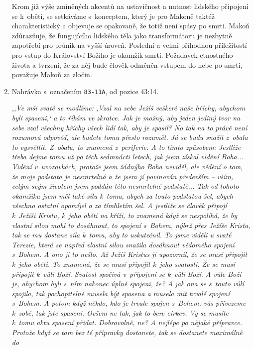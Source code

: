 \begin{enumerate}
{Krom již výše zmíněných akcentů na ustavičnost a nutnost lidského připojení se
        k~oběti, se setkáváme s~konceptem, který je pro Makoně taktéž
        charakteristický a objevuje se opakovaně, že totiž není spásy po smrti.
        Makoň zdůrazňuje, že fungujícího lidského těla jako transformátoru je
        nezbytně zapotřebí pro průnik na vyšší úroveň. Poslední a velmi
        příhodnou příležitostí pro vstup do Království Božího je okamžik smrti.
        Požadavek ctnostného života a tvrzení, že za něj bude člověk odměněn
        vstupem do nebe po smrti, považuje Makoň za zločin.

}

\item{
Nahrávka s~označením \texttt{83-11A}, od pozice 43:14.

\textit{%
,,Ve mši svaté se modlíme: ,Vzal na sebe Ježíš veškeré naše hříchy, abychom byli
spaseni,` a to říkám ve zkratce. Jak je možný, aby jeden jediný tvor na sebe
vzal všechny hříchy všech lidí tak, aby je spasil? No tak na to právě není
rozumová odpověď, ale budete tomu přesto rozumět. Já se budu snažit z~obalu to
vysvětlit. Z~obalu, to znamená z~periferie. A to tímto způsobem: Jestliže třeba
dejme tomu už po těch sedmnácti letech, jak jsem získal vidění Boha... Vidění
v~uvozovkách, protože jsem žádnýho Boha neviděl, ale vědění o tom, že moje
podstata je nesmrtelná a že jsem jí povinován především -- vším, celým svým
životem jsem poddán této nesmrtelné podstatě... Tak od tohoto okamžiku jsem měl
také sílu k~tomu, abych za touto podstatou šel, abych všechno ostatní opomíjel a
za tímhletím šel. A jestliže se člověk připojí k~Ježíši Kristu, k~jeho oběti na
kříži, to znamená když se nespolíhá, že by vlastní silou mohl to dosáhnout, to
spojení s~Bohem, nýbrž přes Ježíše Krista, tak se mu dostane síla k~tomu, aby to
uskutečnil. To jsme viděli u svaté Terezie, která se napřed vlastní silou
snažila dosáhnout vědomého spojení s~Bohem. A ono jí to nešlo. Až Ježíš Kristus
ji upozornil, že se musí připojit k~jeho oběti. To znamená, že se musí připojit
k~jeho svatosti. Že se musí připojit k~vůli Boží. Svatost spočívá v~připojení se
k~vůli Boží. A vůle Boží je, abychom byli s~ním nakonec úplně spojeni, že? A jak
ona se s~touto vůlí spojila, tak pochopitelně musela být spasena a musela mít
trvalé spojení s~Bohem. A potom když někdo, kdo je trvale spojen s~Bohem, vás
přivezeme k~sobě, tak jste spaseni. Ovšem ne tak, jak to bere církev. Vy se
musíte k~tomu aktu spasení přidat. Dobrovolně, ne? A nejlépe po nějaké přípravce.
Protože když se tam bez té přípravky dostanete, tak se dostanete maximálně do
}}
\end{enumerate}

